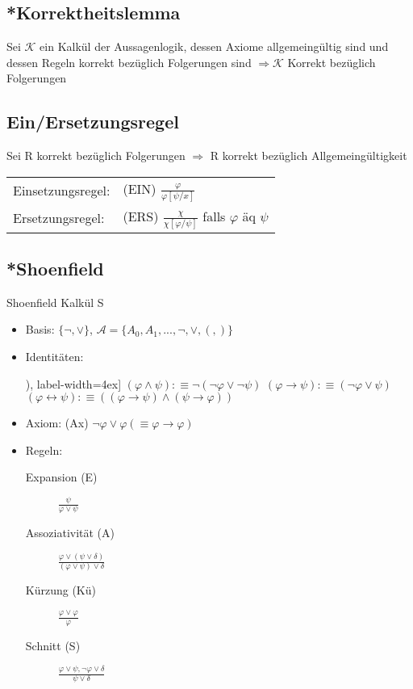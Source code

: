 \documentclass[12pt,a4paper]{article} %
\begin{document}
	\subsection{*Korrektheitslemma}
	Sei $\mathcal{K}$ ein Kalkül der Aussagenlogik, dessen Axiome allgemeingültig sind und dessen Regeln korrekt bezüglich Folgerungen sind $\Rightarrow \mathcal{K}$ Korrekt bezüglich Folgerungen
	
	\subsection{Ein/Ersetzungsregel}
	Sei R korrekt bezüglich Folgerungen $\Rightarrow$ R korrekt bezüglich Allgemeingültigkeit
	
	\begin{tabular}{l l}
		Einsetzungsregel: & (EIN) $\frac{\varphi}{\varphi[\psi/x]}$ \\
		Ersetzungsregel: & (ERS) $\frac{\chi}{\chi[\varphi/\psi]}$ falls $\varphi$ äq $\psi$
	\end{tabular}

	\subsection{*Shoenfield}
	Shoenfield Kalkül S
	\begin{itemize}
		\item Basis: $\{\neg, \lor\}$, $\mathcal{A} = \{A_0, A_1, ..., \neg, \lor, (, )\}$
		\item Identitäten: \begin{tasks}[counter-format=(tsk[r]), label-width=4ex]
			\task $(\varphi \land \psi) :\equiv \neg (\neg \varphi \lor \neg \psi)$ 
			\task $(\varphi \rightarrow \psi) :\equiv (\neg \varphi \lor \psi)$
			\task $(\varphi \leftrightarrow \psi) :\equiv ((\varphi \rightarrow \psi) \land (\psi \rightarrow \varphi))$
		\end{tasks}
		\item Axiom: (Ax) $\neg \varphi \lor \varphi (\equiv \varphi \rightarrow \varphi)$
		\item Regeln: \begin{description}
			\item[Expansion (E)] $\frac{\psi}{\varphi \lor \psi}$
			\item[Assoziativität (A)] $\frac{\varphi \lor (\psi \lor \delta)}{(\varphi \lor \psi) \lor \delta}$
			\item [Kürzung (Kü)] $\frac{\varphi \lor \varphi}{\varphi}$
			\item [Schnitt (S)] $\frac{\varphi \lor \psi, \neg \varphi \lor \delta}{\psi \lor \delta}$
		\end{description}
	\end{itemize}
	
\end{document}
